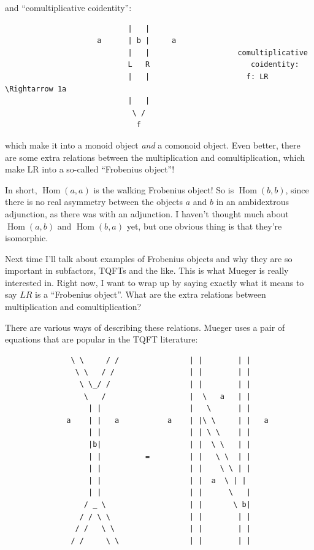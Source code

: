 \documentclass{article}
\begin{document}
and ``comultiplicative coidentity'':

\begin{verbatim}
                            |   |    
                     a      | b |     a 
                            |   |                    comultiplicative
                            L   R                       coidentity:
                            |   |                      f: LR \Rightarrow 1a
                            |   |
                             \ /
                              f
\end{verbatim}

which make it into a monoid object \emph{and} a comonoid object. Even
better, there are some extra relations between the multiplication and
comultiplication, which make LR into a so-called ``Frobenius object''!

In short, \(\operatorname{Hom}(a,a)\) is the walking Frobenius object!
So is \(\operatorname{Hom}(b,b)\), since there is no real asymmetry
between the objects \(a\) and \(b\) in an ambidextrous adjunction, as
there was with an adjunction. I haven't thought much about
\(\operatorname{Hom}(a,b)\) and \(\operatorname{Hom}(b,a)\) yet, but one
obvious thing is that they're isomorphic.

Next time I'll talk about examples of Frobenius objects and why they are
so important in subfactors, TQFTs and the like. This is what Mueger is
really interested in. Right now, I want to wrap up by saying exactly
what it means to say \(LR\) is a ``Frobenius object''. What are the
extra relations between multiplication and comultiplication?

There are various ways of describing these relations. Mueger uses a pair
of equations that are popular in the TQFT literature:

\begin{verbatim}
               \ \     / /                | |        | |
                \ \   / /                 | |        | |
                 \ \_/ /                  | |        | |
                  \   /                   |  \   a   | |
                   | |                    |   \      | |
              a    | |   a           a    | |\ \     | |   a
                   | |                    | | \ \    | |
                   |b|                    | |  \ \   | |
                   | |          =         | |   \ \  | |
                   | |                    | |    \ \ | |
                   | |                    | |  a  \ | |
                   | |                    | |      \   |
                  / _ \                   | |       \ b|
                 / / \ \                  | |        | |
                / /   \ \                 | |        | | 
               / /     \ \                | |        | |
\end{verbatim}
\end{document}
